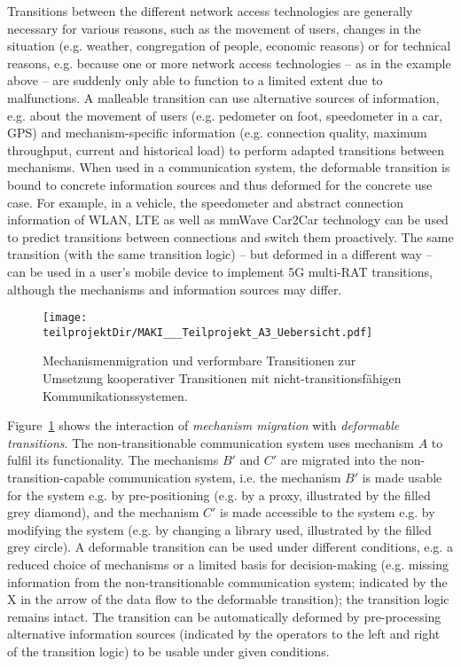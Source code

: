 Transitions between the different network access technologies are generally necessary for various reasons, such as the movement of users, changes in the situation (e.g. weather, congregation of people, economic reasons) or for technical reasons, e.g. because one or more network access technologies -- as in the example above -- are suddenly only able to function to a limited extent due to malfunctions. A malleable transition can use alternative sources of information, e.g. about the movement of users (e.g. pedometer on foot, speedometer in a car, GPS) and mechanism-specific information (e.g. connection quality, maximum throughput, current and historical load) to perform adapted transitions between mechanisms. 
When used in a communication system, the deformable transition is bound to concrete information sources and thus deformed for the concrete use case.
For example, in a vehicle, the speedometer and abstract connection information of WLAN, LTE as well as mmWave Car2Car technology can be used to predict transitions between connections and switch them proactively. 
The same transition (with the same transition logic) -- but deformed in a different way -- can be used in a user's mobile device to implement 5G multi-RAT transitions, although the mechanisms and information sources may differ. 

\begin{figure}[H]
    \centering
    \texttt{[image: \\teilprojektDir/MAKI\_\_\_Teilprojekt\_A3\_Uebersicht.pdf]}
    \caption{Mechanismenmigration und verformbare Transitionen zur Umsetzung kooperativer Transitionen mit nicht-transitionsfähigen Kommunikationssystemen.}
    \label{fig:bigpicture}
\end{figure}

Figure~\ref{fig:bigpicture} shows the interaction of \emph{mechanism migration} with \textit{deformable transitions}.
The non-transitionable communication system uses mechanism $A$ to fulfil its functionality.
The mechanisms $B'$ and $C'$ are migrated into the non-transition-capable communication system, i.e. the mechanism $B'$ is made usable for the system e.g. by pre-positioning (e.g. by a proxy, illustrated by the filled grey diamond), and  
the mechanism $C'$ is made accessible to the system e.g. by modifying the system (e.g. by changing a library used, illustrated by the filled grey circle).
A deformable transition can be used under different conditions, e.g. a reduced choice of mechanisms or a limited basis for decision-making (e.g. missing information from the non-transitionable communication system; indicated by the X in the arrow of the data flow to the deformable transition); the transition logic remains intact. 
The transition can be automatically deformed by pre-processing alternative information sources (indicated by the operators to the left and right of the transition logic) to be usable under given conditions. 

